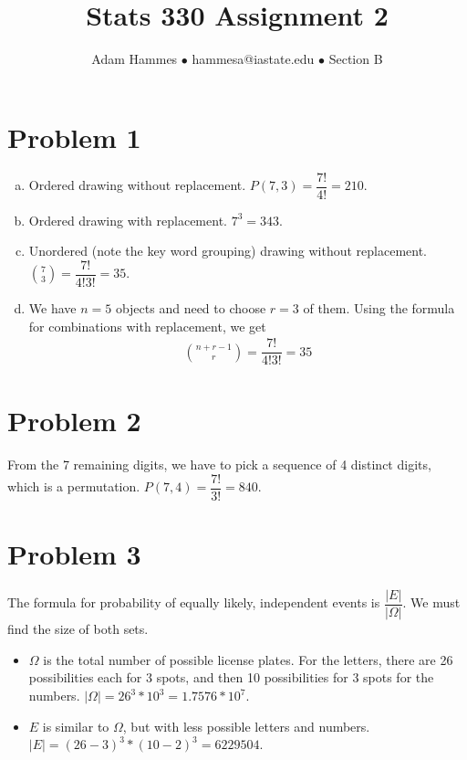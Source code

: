 \documentclass[11pt]{article}
\begin{document}
\title{Stats 330 Assignment 2}
\author{Adam Hammes $\bullet$ hammesa@iastate.edu $\bullet$ Section B}
\maketitle

\section*{Problem 1}
	\begin{enumerate}[(a)]
		\item Ordered drawing without replacement. $P( 7, 3) = \dfrac{7!}{4!} = 
		210$.
		
		\item Ordered drawing with replacement. $7^3 = 343$.
		
		\item Unordered (note the key word grouping) drawing without replacement. $\binom{7}{3} = \dfrac{7!}{4!3!} = 35$.
		
		\item We have $n= 5$ objects and need to choose $r=3$ of them. Using the formula for combinations with replacement, we get
		\begin{align*}
		\binom{n+r-1}{r} =\dfrac{7!}{4!3!} = 35 
		\end{align*}
		
	
	\end{enumerate}
	
\section*{Problem 2}

From the 7 remaining digits, we have to pick a sequence of 4 distinct digits, which is a permutation. $P(7, 4) = \dfrac{7!}{3!} = 840$.

\section*{Problem 3}

The formula for probability of equally likely, independent events is $\dfrac{|E|}{|\Omega|}$. We must find the size of both sets.
\begin{itemize}
	\item $\Omega$ is the total number of possible license plates. For the letters, there are 26 possibilities each for 3 spots, and then 10 possibilities for 3 spots for the numbers. $|\Omega| = 26^3 * 10^ 3 = 1.7576 * 10^7$.
	
	\item $E$ is similar to $\Omega$, but with less possible letters and numbers. $|E| = (26-3)^3 * (10-2)^3 = 6229504$.
\end{itemize}	
\end{document}
